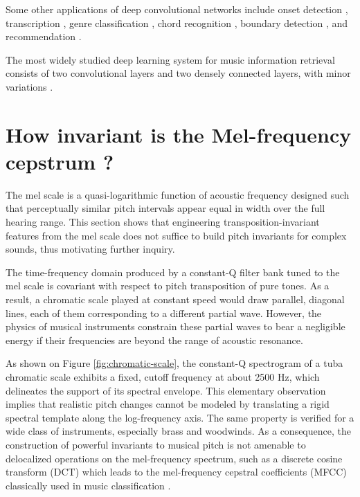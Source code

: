 \documentclass{article}
\begin{document}
Some other applications of deep convolutional networks include onset
detection \cite{Schluter2014}, transcription \cite{Sigtia2015},
genre classification \cite{Choi2015},
chord recognition \cite{Humphrey2012}, boundary detection \cite{Ullrich2014}, and
recommendation \cite{vandenOord2013}.

The most widely studied deep learning system for music information retrieval
consists of two convolutional layers and two densely connected layers,
with minor variations \cite{Dieleman2014, Humphrey2012, Kereliuk2015, Li2015,
McFee2015-muda, Schluter2014, Ullrich2014}.



\section{How invariant is the Mel-frequency cepstrum ?}
The mel scale is a quasi-logarithmic function of acoustic frequency designed such that
perceptually similar pitch intervals appear equal in width over the full hearing range.
This section shows that engineering transposition-invariant features from the mel
scale does not suffice to build pitch invariants for complex sounds, thus motivating
further inquiry.

The time-frequency domain produced by a constant-Q filter bank tuned to the mel
scale is covariant with respect to pitch transposition of pure tones.
As a result, a chromatic scale played at constant speed would draw parallel,
diagonal lines, each of them corresponding to a different partial wave.
However, the physics of musical instruments constrain these partial waves to bear
a negligible energy if their frequencies are beyond the range of acoustic resonance.

As shown on Figure \ref{fig:chromatic-scale}, the constant-Q spectrogram of a
tuba chromatic scale exhibits a fixed, cutoff frequency at about 2500 Hz, which
delineates the support of its spectral envelope.
This elementary observation implies that realistic pitch changes cannot be modeled
by translating a rigid spectral template along the log-frequency axis.
The same property is verified for a wide class of instruments, especially brass and
woodwinds.
As a consequence, the construction of powerful invariants to musical pitch is not
amenable to delocalized operations on the mel-frequency spectrum, such as a
discrete cosine transform (DCT) which leads to the mel-frequency cepstral
coefficients (MFCC) classically used in music classification
\cite{Eronen2000, Joder2009}.
\end{document}
